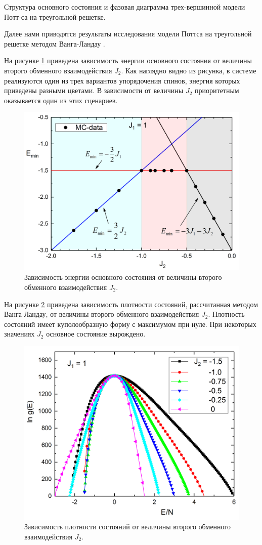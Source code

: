 Структура основного состояния и фазовая диаграмма трех-вершинной модели Потт-са на треугольной решетке.

Далее нами приводятся результаты исследования модели Поттса на треугольной решетке методом Ванга-Ландау \cite{phys3-bib-4, phys3-bib-5, phys3-bib-6, phys3-bib7}.

На рисунке \ref{phys3-pic-2} приведена зависимость энергии основного состояния от величины второго обменного взаимодействия $J_2$. Как наглядно видно из рисунка, в системе реализуются один из трех вариантов упорядочения спинов, энергия которых приведены разными цветами. В зависимости от величины $J_2$ приоритетным оказывается один из этих сценариев.

\begin{figure}[H]
	\centering
	\includegraphics[width=0.5\linewidth]{content/sections/images/phys3-2}
	\caption{Зависимость энергии основного состояния от величины второго обменного взаимодействия $J_2$.}
	\label{phys3-pic-2}
\end{figure}

На рисунке \ref{phys3-pic-3} приведена зависимость плотности состояний, рассчитанная методом Ванга-Ландау, от величины второго обменного взаимодействия $J_2$. Плотность состояний имеет куполообразную форму с максимумом при нуле. При некоторых значениях $J_2$ основное состояние вырождено.

\begin{figure}[H]
	\centering
	\includegraphics[width=0.5\linewidth]{content/sections/images/phys3-3}
	\caption{Зависимость плотности состояний от величины второго обменного взаимодействия $J_2$.}
	\label{phys3-pic-3}
\end{figure}

